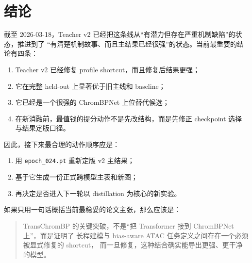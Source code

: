 \documentclass[11pt,a4paper]{ctexart}
\begin{document}
\section{结论}

截至 2026-03-18，Teacher v2 已经把这条线从“有潜力但存在严重机制缺陷”的状态，推进到了
“有清楚机制故事、而且主结果已经很强”的状态。当前最重要的结论有四条：
\begin{enumerate}[leftmargin=2em]
  \item Teacher v2 已经修复 profile shortcut，而且修复后结果更强；
  \item 它在完整 held-out 上显著优于旧主线和 baseline；
  \item 它已经是一个很强的 ChromBPNet 上位替代候选；
  \item 在新消融前，最值钱的提分动作不是先改结构，而是先修正 checkpoint 选择与结果定版口径。
\end{enumerate}

因此，接下来最合理的动作顺序应是：
\begin{enumerate}[leftmargin=2em]
  \item 用 \texttt{epoch\_024.pt} 重新定版 v2 主结果；
  \item 基于它生成一份正式跨模型主表和新图；
  \item 再决定是否进入下一轮以 distillation 为核心的新实验。
\end{enumerate}

如果只用一句话概括当前最稳妥的论文主张，那么应该是：
\begin{quote}
TransChromBP 的关键突破，不是“把 Transformer 接到 ChromBPNet 上”，而是证明了
长程建模与 bias-aware ATAC 任务定义之间存在一个必须被显式修复的 shortcut，
而一旦修复，这种结合确实能导出更强、更干净的模型。
\end{quote}
\end{document}
